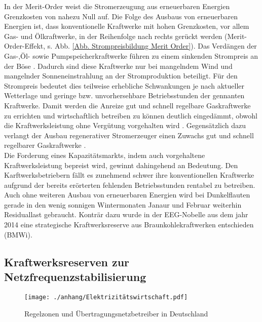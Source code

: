 		In der Merit-Order weist die Stromerzeugung aus erneuerbaren Energien Grenzkosten von nahezu Null auf.
		Die Folge des Ausbaus von erneuerbaren Energien ist, dass konventionelle Kraftwerke mit hohen Grenzkosten, vor allem Gas- und Ölkraftwerke, in der Reihenfolge nach rechts gerückt werden (Merit-Order-Effekt, s. Abb. \ref{Abb. Strompreisbildung Merit Order}).
		Das Verdängen der Gas-,Öl- sowie Pumpspeicherkraftwerke führen zu einem sinkenden Strompreis an der Böse \cite{Frauenhofer_PV_Bericht}.
		Dadurch sind diese Kraftwerke nur bei mangelndem Wind und mangelnder Sonneneinstrahlung an der Stromproduktion beteiligt.
		Für den Strompreis bedeutet dies teilweise erhebliche Schwankungen je nach aktueller Wetterlage und geringe bzw. unvorhersehbare Betriebsstunden der gennanten Kraftwerke. 
		Damit werden die Anreize gut und schnell regelbare Gaskraftwerke zu errichten und wirtschaftlich betreiben zu können deutlich eingedämmt, obwohl die Kraftwerksleistung ohne Vergütung vorgehalten wird \cite{Frauenhofer_PV_Bericht}.
		Gegensätzlich dazu verlangt der Ausbau regenerativer Stromerzeuger einen Zuwachs gut und schnell regelbarer Gaskraftwerke \cite{Doktorarbeit_Reitsam}. \\
		
		Die Forderung eines Kapazitätsmarkts, indem auch vorgehaltene Kraftwerksleistung bepreist wird, gewinnt dahingehend an Bedeutung.
		Den Karftwerksbetriebern fällt es zunehmend schwer ihre konventionellen Kraftwerke aufgrund der bereits erörterten fehlenden Betriebsstunden rentabel zu betreiben.
		Auch ohne weiteren Ausbau von erneuerbaren Energien wird bei Dunkelflauten gerade in den wenig sonnigen Wintermonaten Janaur und Februar weiterhin Residuallast gebraucht.
		Konträr dazu wurde in der EEG-Nobelle aus dem jahr 2014 eine strategische Kraftwerksreserve aus Braunkohlekraftwerken entschieden (BMWi).		
				
	\subsection{Kraftwerksreserven zur Netzfrequenzstabilisierung}
	
		\begin{wrapfigure}{r}{0.5\textwidth}
			\centering
			\texttt{[image: ./anhang/Elektrizitätswirtschaft.pdf]}
			\caption{Regelzonen und Übertragungsnetzbetreiber in Deutschland \cite{Elektrizitätswirtschaft}}
			\label{Abb. Regelzonen Deutschland}
		\end{wrapfigure}
	
